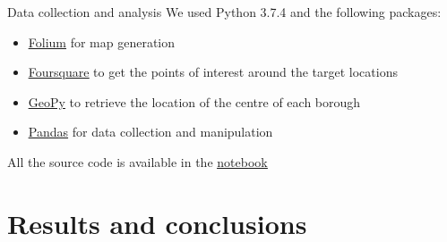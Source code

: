 \documentclass{beamer}
\begin{document}
\begin{frame}{Data collection and analysis}
We used Python 3.7.4 and the following packages:
\begin{itemize}
  \item \href{https://python-visualization.github.io/folium/}{\underline{Folium}} for map generation
  \item \href{https://developer.foursquare.com/}{\underline{Foursquare}} to get the points of interest around the target locations
	\item \href{https://geopy.readthedocs.io/en/stable/}{\underline{GeoPy}} to retrieve the location of the centre of each borough 
	\item \href{https://pandas.pydata.org/}{\underline{Pandas}} for data collection and manipulation
\end{itemize}

All the source code is available in the \href{https://github.com/biancovic/Coursera_Capstone/blob/master/BattleOfNeighbourhoods/BattleOfNeighbourhoods.ipynb}{\underline{notebook}}
\end{frame}

\section{Results and conclusions}
\end{document}
